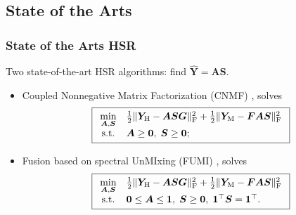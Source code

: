\documentclass[10pt,mathserif]{beamer}
\newcommand{\YH}{\bm Y_\text H}
\newcommand{\YM}{\bm Y_\text M}
\newcommand{\Tr}{^\top}%
\newcommand{\Fr}{_\text F}
\begin{document}
\subsection{State of the Arts}
    \begin{frame}
        \frametitle{State of the Arts HSR}
        Two state-of-the-art HSR algorithms: find $\hat{\bm Y} = \bm A \bm S$.
        \begin{itemize}
            \item Coupled Nonnegative Matrix Factorization (CNMF) \cite{CNMF}, solves \\
                  \[\boxed{
                       \begin{array}{cl}
                           \underset{\bm A,\bm S}{\min}
                           &
                           \frac{1}{2} \Vert \YH - \bm A \bm S \bm G \Vert\Fr^2 +
                           \frac{1}{2} \Vert \YM - \bm F \bm A \bm S \Vert\Fr^2 \\
                           \text{s.t.}
                           &
                           \bm A \geq \bm 0,\;\bm S \geq \bm 0;
                       \end{array}
                    }\]
            \item Fusion based on spectral UnMIxing (FUMI) \cite{FUMI}, solves \\
                  \[\boxed{
                       \begin{array}{cl}
                           \underset{\bm A,\bm S}{\min}
                           &
                           \frac{1}{2} \Vert \YH - \bm A \bm S \bm G \Vert\Fr^2 +
                           \frac{1}{2} \Vert \YM - \bm F \bm A \bm S \Vert\Fr^2 \\
                           \text{s.t.}
                           &
                           \bm 0 \leq \bm A \leq \bm 1,\;\bm S \geq \bm 0,\;\bm 1\Tr \bm S = \bm 1\Tr.
                       \end{array}
                    }\]
        \end{itemize}
    \end{frame}
\end{document}
